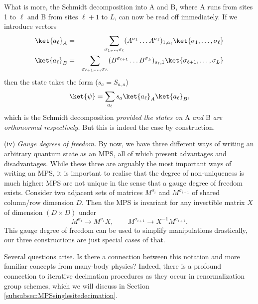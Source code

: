 What is more, the Schmidt decomposition into A and B, where A runs from sites 1 to $\ell$ and B from sites $\ell+1$ to $L$, can now be read off immediately. If we introduce vectors
\begin{eqnarray}
\ket{a_\ell}_A &=& \sum_{\sigma_1,\ldots,\sigma_\ell}
(A^{\sigma_1} \ldots A^{\sigma_\ell})_{1,a_\ell}
 \ket{\sigma_1,\ldots,\sigma_\ell} \\
\ket{a_\ell}_B &=&  \sum_{\sigma_{\ell+1},\ldots,\sigma_L} 
(B^{\sigma_{\ell+1}} \ldots B^{\sigma_L})_{a_\ell,1}
\ket{\sigma_{\ell+1},\ldots,\sigma_L}
\end{eqnarray}
then the state takes the form ($s_a = S_{a,a}$)
\begin{equation}
\ket{\psi} = \sum_{a_\ell} s_a \ket{a_\ell}_A \ket{a_\ell}_B ,
\end{equation}
which is the Schmidt decomposition {\em provided the states on} A {\em and} B {\em are orthonormal respectively.} But this is indeed the case by construction.

(iv) {\em Gauge degrees of freedom.} By now, we have three different ways of writing an arbitrary quantum state as an MPS, all of which present advantages and disadvantages. While these three are arguably the most important ways of writing an MPS, it is important to realise that the degree of non-uniqueness is much higher: MPS are not unique  in the sense that a gauge degree of freedom exists. Consider two adjacent sets of matrices $M^{\sigma_i}$ and $M^{\sigma_{i+1}}$ of shared column/row dimension $D$. Then the MPS is invariant for any invertible matrix $X$ of dimension $(D\times D)$ under
\begin{equation}
M^{\sigma_i} \rightarrow M^{\sigma_i} X, \quad \quad M^{\sigma_{i+1}} \rightarrow X^{-1}M^{\sigma_{i+1}} .
\end{equation}
This gauge degree of freedom can be used to simplify manipulations drastically, our three constructions are just special cases of that.
 
Several questions arise. Is there a connection between this notation and more familiar concepts from many-body physics? Indeed, there is a profound connection to iterative decimation procedures as they occur in renormalization group schemes, which we will discuss in Section \ref{subsubsec:MPSsinglesitedecimation}. 

